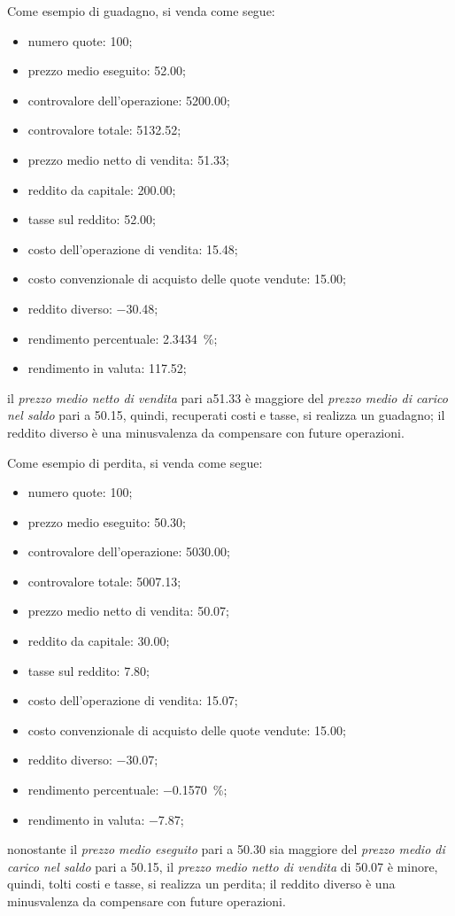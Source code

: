 \documentclass[12pt,a4paper]{article}
\newcommand{\Eur}[1]{\SI{#1}{\text{\euro{}}}}
\begin{document}
Come esempio di guadagno, si venda come segue:
\begin{itemize}
\item numero quote: \num{100};
\item prezzo medio eseguito: \Eur{52,00};
\item controvalore dell'operazione: \Eur{5200,00};
\item controvalore totale: \Eur{5132,52};
\item prezzo medio netto di vendita: \Eur{51,33};

\item reddito da capitale: \Eur{200,00};
\item tasse sul reddito: \Eur{52,00};
\item costo dell'operazione di vendita: \Eur{15,48};
\item costo convenzionale di acquisto delle quote vendute: \Eur{15,00};
\item reddito diverso: \Eur{-30,48};

\item rendimento percentuale: \SI{2,3434}{\percent};
\item rendimento in valuta: \Eur{117,52};
\end{itemize}
il \emph{prezzo medio netto di vendita} pari a\Eur{51,33} è maggiore del \emph{prezzo
   medio di carico  nel saldo} pari a \Eur{50,15}, quindi,  recuperati costi e tasse,
si realizza  un guadagno;  il reddito  diverso è una  minusvalenza da  compensare con
future operazioni.


Come esempio di perdita, si venda come segue:
\begin{itemize}
\item numero quote: \num{100};
\item prezzo medio eseguito: \Eur{50,30};
\item controvalore dell'operazione: \Eur{5030,00};
\item controvalore totale: \Eur{5007,13};
\item prezzo medio netto di vendita: \Eur{50,07};

\item reddito da capitale: \Eur{30,00};
\item tasse sul reddito: \Eur{7,80};
\item costo dell'operazione di vendita: \Eur{15,07};
\item costo convenzionale di acquisto delle quote vendute: \Eur{15,00};
\item reddito diverso: \Eur{-30,07};

\item rendimento percentuale: \SI{-0,1570}{\percent};
\item rendimento in valuta: \Eur{-7,87};
\end{itemize}
nonostante  il \emph{prezzo  medio  eseguito}  pari a  \Eur{50,30}  sia maggiore  del
\emph{prezzo medio  di carico nel  saldo} pari  a \Eur{50,15}, il  \emph{prezzo medio
   netto  di vendita}  di  \Eur{50,07} è  minore,  quindi, tolti  costi  e tasse,  si
realizza un perdita;  il reddito diverso è una minusvalenza  da compensare con future
operazioni.
\end{document}
